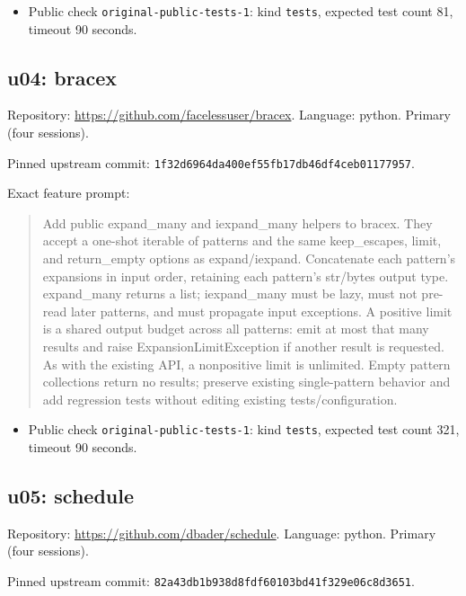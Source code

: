 \documentclass[manuscript,screen,nonacm]{acmart}
\providecommand{\tightlist}{\setlength{\itemsep}{0pt}\setlength{\parskip}{0pt}}
\begin{document}
\begin{itemize}
\tightlist
\item
  Public check \nolinkurl{original-public-tests-1}: kind \texttt{tests},
  expected test count 81, timeout 90 seconds.
\end{itemize}

\subsection{u04: bracex}\label{u04-bracex}

Repository: \url{https://github.com/facelessuser/bracex}. Language:
python. Primary (four sessions).

Pinned upstream commit:
\nolinkurl{1f32d6964da400ef55fb17db46df4ceb01177957}.

Exact feature prompt:

\begin{quote}
Add public expand\_many and iexpand\_many helpers to bracex. They accept
a one-shot iterable of patterns and the same keep\_escapes, limit, and
return\_empty options as expand/iexpand. Concatenate each pattern's
expansions in input order, retaining each pattern's str/bytes output
type. expand\_many returns a list; iexpand\_many must be lazy, must not
pre-read later patterns, and must propagate input exceptions. A positive
limit is a shared output budget across all patterns: emit at most that
many results and raise ExpansionLimitException if another result is
requested. As with the existing API, a nonpositive limit is unlimited.
Empty pattern collections return no results; preserve existing
single-pattern behavior and add regression tests without editing
existing tests/configuration.
\end{quote}

\begin{itemize}
\tightlist
\item
  Public check \nolinkurl{original-public-tests-1}: kind \texttt{tests},
  expected test count 321, timeout 90 seconds.
\end{itemize}

\subsection{u05: schedule}\label{u05-schedule}

Repository: \url{https://github.com/dbader/schedule}. Language: python.
Primary (four sessions).

Pinned upstream commit:
\nolinkurl{82a43db1b938d8fdf60103bd41f329e06c8d3651}.
\end{document}
